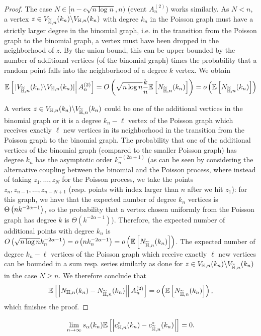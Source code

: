 \begin{proof}
The case $N \in [n-c\sqrt{n\log n},n)$ (event $A_n^{(2)}$) works similarly.
As $N < n$, a vertex $z \in V_{\widetilde{\mathbb{H}},n}(k_n) \backslash V_{\mathbb{H},n}(k_n)$ with degree $k_n$ in the Poisson graph must have a strictly larger degree in the binomial graph, i.e. in the transition from the Poisson graph to the binomial graph, a vertex must have been dropped in the neighborhood of $z$. By the union bound, this can be upper bounded by the number of additional vertices (of the binomial graph) times the probability that a random point falls into the neighborhood of a degree $k$ vertex. We obtain
\begin{align*}
	\mathbb{E}\left[\left.|V_{\widetilde{\mathbb{H}},n}(k_n) \backslash V_{\mathbb{H},n}(k_n)|\right|A_n^{(2)}\right] = O\left( \sqrt{n\log n}\frac{k}{n} \mathbb{E}\left[N_{\widetilde{\mathbb{H}},n}(k_n)\right] \right)
	= o\left(\mathbb{E}\left[N_{\widetilde{\mathbb{H}},n}(k_n)\right]\right)
\end{align*}

A vertex $z \in V_{\mathbb{H},n}(k_n) \backslash V_{\widetilde{\mathbb{H}},n}(k_n)$ could be one of the additional vertices in the binomial graph or it is a degree $k_n-\ell$ vertex of the Poisson graph which receives exactly $\ell$ new vertices in its neighborhood in the transition from the Poisson graph to the binomial graph. The probability that one of the additional vertices of the binomial graph (compared to the smaller Poisson graph) has degree $k_n$ has the asymptotic order $k_n^{-(2\alpha+1)}$ (as can be seen by considering the alternative coupling between the binomial and the Poisson process, where instead of taking $z_1, \dots, z_N$ for the Poisson process, we take the points $z_n, z_{n-1}, \dots, z_{n-N+1}$ (resp. points with index larger than $n$ after we hit $z_1$): for this graph, we have that the expected number of degree $k_n$ vertices is $\Theta\left(n k^{-2\alpha-1}\right)$, so the probability that a vertex chosen uniformly from the Poisson graph has degree $k$ is $\Theta(k^{-2\alpha-1})$). Therefore, the expected number of additional points with degree $k_n$ is $O\left(\sqrt{n\log n} k_n^{-2\alpha-1}\right) = o\left(n k_n^{-2\alpha-1}\right) = o\left(\mathbb{E}\left[N_{\widetilde{\mathbb{H}},n}(k_n)\right]\right)$. The expected number of degree $k_n-\ell$ vertices of the Poisson graph which receive exactly $\ell$ new vertices can be bounded in a sum resp. series similarly as done for $z \in V_{\mathbb{H},n}(k_n) \backslash V_{\widetilde{\mathbb{H}},n}(k_n)$ in the case $N \geq n$. We therefore conclude that
\[
	\mathbb{E}\left[\left.\left|N_{\mathbb{H},n}(k_n)-N_{\widetilde{\mathbb{H}},n}(k_n)\right|\right|A_n^{(2)}\right] = o\left(\mathbb{E}\left[N_{\widetilde{\mathbb{H}},n}(k_n)\right]\right),
\]
which finishes the proof.
\end{proof}

\begin{proposition}
\[
	\lim_{n \to \infty} s_\alpha(k_n)\mathbb{E}\left[\left|c_{\mathbb{H},n}^\ast(k_n) - c_{\widetilde{\mathbb{H}},n}^\ast(k_n)\right|\right] = 0.
\]
\end{proposition}


